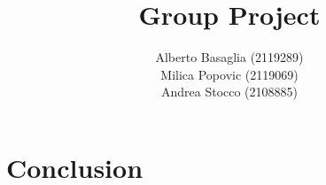 \documentclass{template}
\title{Group Project}
\author{
Alberto Basaglia (2119289)\\
Milica Popovic (2119069)\\
Andrea Stocco (2108885)}
\begin{document}


\chapter{Conclusion}


\appendix
\end{document}
